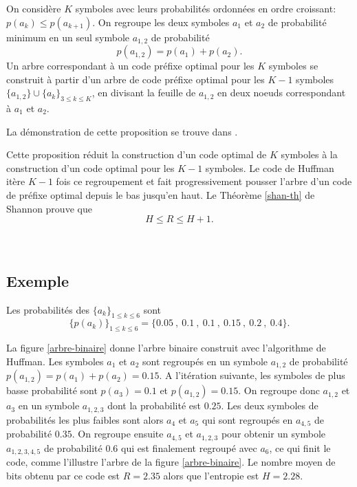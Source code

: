 \begin{proposition}
On consid\`ere $K$ symboles avec leurs probabilit\'es
ordonn\'ees en ordre croissant: $p(a_k) \leq p(a_{k+1})$.
On regroupe les deux symboles $a_1$ et $a_2$ de probabilit\'e
minimum en un seul symbole $a_{1,2}$ de probabilit\'e
\[
p(a_{1,2}) = p(a_1) + p(a_2) .
\]
Un arbre correspondant \`a un code pr\'efixe optimal pour
les $K$ symboles se construit \`a partir
d'un arbre de code pr\'efixe optimal pour les $K-1$ symboles
$\{a_{1,2}\} \cup \{ a_k \}_{3 \leq k \leq K}$,
en divisant la feuille de
$a_{1,2}$ en deux noeuds correspondant \`a $a_1$ et $a_2$.
\end{proposition}

La d\'emonstration de cette proposition se trouve dans
\cite{bremaud-proba}.

Cette proposition r\'eduit la construction d'un code optimal de
$K$ symboles \`a la construction
d'un code optimal pour les $K-1$ symboles.
Le code de Huffman it\`ere $K-1$ fois
ce regroupement et fait progressivement pousser l'arbre
d'un code de pr\'efixe optimal depuis le bas jusqu'en haut.
Le Th\'eor\`eme \ref{shan-th} de Shannon prouve que
\begin{equation}
\label{entropy-bound}
H \leq R  \leq H + 1 .
\end{equation}
\\
\\
\subsection{Exemple}
Les probabilit\'es des $\{a_k\}_{1 \leq k \leq 6}$ sont
\begin{equation}
\label{proba-code}
\{p(a_k)\}_{1 \leq k \leq 6} = \{0.05~,~0.1~,~0.1~,~0.15~,~0.2~,~0.4\}.
\end{equation}

La figure \ref{arbre-binaire}
donne l'arbre binaire construit avec l'algorithme
de Huffman.
Les symboles $a_1$ et $a_2$ sont regroup\'es
en un symbole $a_{1,2}$
de probabilit\'e $p(a_{1,2}) = p(a_1)+p(a_2)= 0.15$. A l'it\'eration suivante,
les symboles de plus basse probabilit\'e sont
$p(a_3) = 0.1$ et $p(a_{1,2}) = 0.15$. On regroupe donc
$a_{1,2}$ et $a_3$ en un symbole $a_{1,2,3}$ dont la probabilit\'e
est $0.25$. Les deux symboles de probabilit\'es les plus faibles sont
alors $a_4$ et
$a_5$ qui sont regroup\'es en $a_{4,5}$
de probabilit\'e $0.35$. On regroupe ensuite $a_{4,5}$ et
$a_{1,2,3}$ pour obtenir un symbole $a_{1,2,3,4,5}$ de probabilit\'e
$0.6$ qui est finalement regroup\'e avec $a_6$, ce qui finit
le code, comme l'illustre
l'arbre de la figure \ref{arbre-binaire}.
Le nombre moyen de bits obtenu par ce code est
$R= 2.35$ alors que l'entropie est $H = 2.28$.

